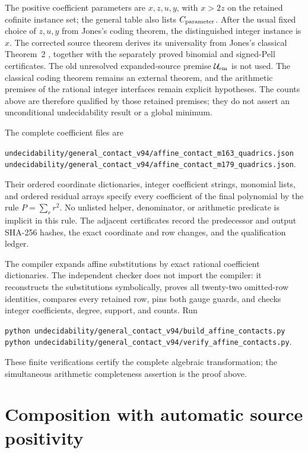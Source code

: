 \documentclass[11pt]{article}
\begin{document}
The positive coefficient parameters are $x,z,u,y$, with $x>2z$ on
the retained cofinite instance set; the general table also lists
$C_{\rm parameter}$. After the usual fixed choice of $z,u,y$ from
Jones's coding theorem, the distinguished integer instance is $x$.
The corrected source theorem \cite{corrected} derives its universality
from Jones's classical Theorem~2 \cite[p.~860]{Jones80}, together with
the separately proved binomial and signed-Pell certificates. The old
unresolved expanded-source premise $\mathcal U_{\rm em}$ is not used.
The classical coding theorem remains an external theorem, and the
arithmetic premises of the rational integer interfaces remain explicit
hypotheses. The counts above are therefore qualified by those retained
premises; they do not assert an unconditional undecidability result or
a global minimum.

The complete coefficient files are
\begin{center}\small
\nolinkurl{undecidability/general_contact_v94/affine_contact_m163_quadrics.json}\\
\nolinkurl{undecidability/general_contact_v94/affine_contact_m179_quadrics.json}.
\end{center}
Their ordered coordinate dictionaries, integer coefficient strings,
monomial lists, and ordered residual arrays specify every coefficient
of the final polynomial by the rule $P=\sum_r r^2$. No unlisted
helper, denominator, or arithmetic predicate is implicit in this rule.
The adjacent certificates record the predecessor and output SHA-256
hashes, the exact coordinate and row changes, and the qualification
ledger.

The compiler expands affine substitutions by exact rational coefficient
dictionaries. The independent checker does not import the compiler: it
reconstructs the substitutions symbolically, proves all twenty-two
omitted-row identities, compares every retained row, pins both gauge
guards, and checks integer coefficients, degree, support, and counts.
Run
\begin{center}\small
\texttt{python undecidability/general\_contact\_v94/build\_affine\_contacts.py}\\
\texttt{python undecidability/general\_contact\_v94/verify\_affine\_contacts.py}.
\end{center}
These finite verifications certify the complete algebraic transformation;
the simultaneous arithmetic completeness assertion is the proof above.

\section{Composition with automatic source positivity}
\end{document}
